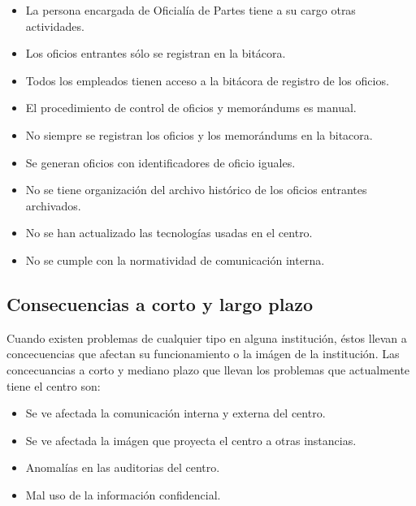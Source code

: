 \begin{itemize}
	
	\item La persona encargada de Oficialía de Partes tiene a su cargo otras actividades.
	\item Los oficios entrantes sólo se registran en la bitácora.
	\item Todos los empleados tienen acceso a la bitácora de registro de los oficios.
	\item El procedimiento de control de oficios y memorándums es manual.
	\item No siempre se registran los oficios y los memorándums en la bitacora.
	\item Se generan oficios con identificadores de oficio iguales.
	\item No se tiene organización del archivo histórico de los oficios entrantes archivados.
	\item No se han actualizado las tecnologías usadas en el centro.
	\item No se cumple con la normatividad de comunicación interna.
	
\end{itemize}

\subsection{Consecuencias a corto y largo plazo}

Cuando existen problemas de cualquier tipo en alguna institución, éstos llevan a concecuencias que afectan su funcionamiento o la imágen de la institución. Las concecuancias a corto y mediano plazo que llevan los problemas que actualmente tiene el centro son:

\begin{itemize}
	\item Se ve afectada la comunicación interna y externa del centro.
	\item Se ve afectada la imágen que proyecta el centro a otras instancias.
	\item Anomalías en las auditorias del centro.
	\item Mal uso de la información confidencial.
\end{itemize}
